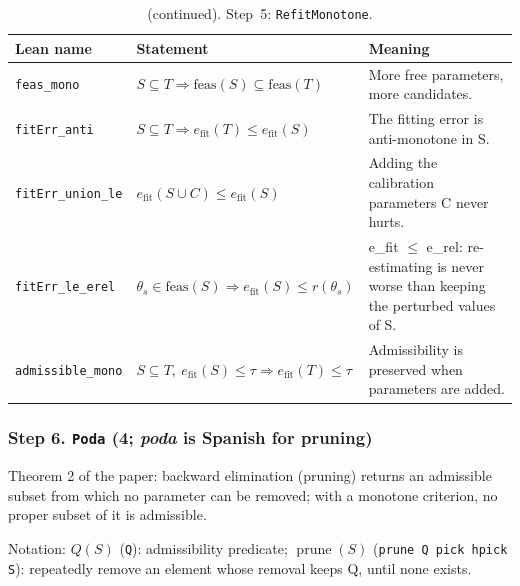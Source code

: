 \addtocounter{table}{-1}
{\small
\begin{longtable}{@{}>{\raggedright\arraybackslash}p{3.6cm}>{\raggedright\arraybackslash}p{6.6cm}>{\raggedright\arraybackslash}p{5.6cm}@{}}
\caption[]{(continued). Step~5: \texttt{RefitMonotone}.}\\
\toprule
Lean name & Statement & Meaning \\
\midrule
\endhead
\texttt{feas\_\allowbreak{}mono} & $\displaystyle S\subseteq T\Rightarrow\mathrm{feas}(S)\subseteq\mathrm{feas}(T)$ & More free parameters, more candidates. \\[3pt]
\texttt{fitErr\_\allowbreak{}anti} & $\displaystyle S\subseteq T\Rightarrow e_{\mathrm{fit}}(T)\le e_{\mathrm{fit}}(S)$ & The fitting error is anti-monotone in S. \\[3pt]
\texttt{fitErr\_\allowbreak{}union\_\allowbreak{}le} & $\displaystyle e_{\mathrm{fit}}(S\cup C)\le e_{\mathrm{fit}}(S)$ & Adding the calibration parameters C never hurts. \\[3pt]
\texttt{fitErr\_\allowbreak{}le\_\allowbreak{}erel} & $\displaystyle \theta_s\in\mathrm{feas}(S)\Rightarrow e_{\mathrm{fit}}(S)\le r(\theta_s)$ & e\_fit $\le$ e\_rel: re-estimating is never worse than keeping the perturbed values of S. \\[3pt]
\texttt{admissible\_\allowbreak{}mono} & $\displaystyle S\subseteq T,\ e_{\mathrm{fit}}(S)\le\tau\Rightarrow e_{\mathrm{fit}}(T)\le\tau$ & Admissibility is preserved when parameters are added. \\[3pt]
\bottomrule
\end{longtable}
}

\subsubsection*{Step 6. \texttt{Poda} (4; \emph{poda} is Spanish for pruning)}
Theorem 2 of the paper: backward elimination (pruning) returns an admissible subset from which no parameter can be removed; with a monotone criterion, no proper subset of it is admissible.

{\small\raggedright Notation: $Q(S)$ (\texttt{Q}): admissibility predicate; $\operatorname{prune}(S)$ (\texttt{prune Q pick hpick S}): repeatedly remove an element whose removal keeps Q, until none exists.}

